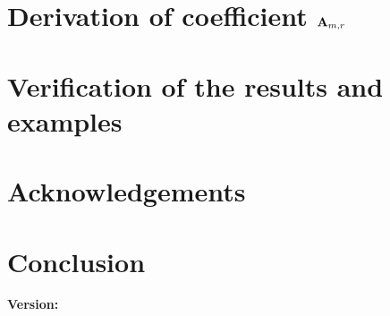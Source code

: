 \documentclass[12pt,letterpaper,oneside,reqno]{amsart}
\newcommand \coeffA [3][A] {{\mathbf{#1}} \sb{#2,#3}}
\numberwithin{equation}{section}
\begin{document}
    \section{Derivation of coefficient \texorpdfstring{$\coeffA{m}{r}$}{A[m,r]}}
    \label{sec:derivation-of-coefficients-a}
    


    \section{Verification of the results and examples}
    \label{sec:verification-of-the-results-and-examples}
    


    \section{Acknowledgements}
    \label{sec:acknowledgements}
    


    \section{Conclusion}
    \label{sec:conclusion}
    

    
    
    \noindent \textbf{Version:} 
\end{document}
